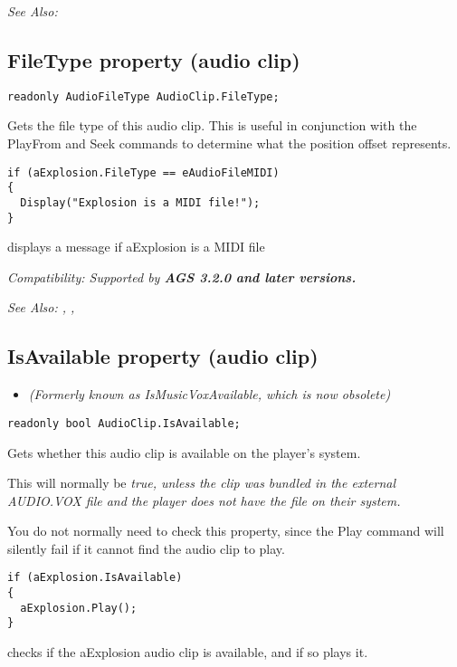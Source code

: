 \it{See Also:} 


\subsection{FileType property (audio clip)}\label{AudioClip.FileType}%

\begin{verbatim}
readonly AudioFileType AudioClip.FileType;
\end{verbatim}
Gets the file type of this audio clip. This is useful in conjunction with the PlayFrom
and Seek commands to determine what the position offset represents.

\begin{verbatim}
if (aExplosion.FileType == eAudioFileMIDI)
{
  Display("Explosion is a MIDI file!");
}
\end{verbatim}
displays a message if aExplosion is a MIDI file

\it{Compatibility:} Supported by \bf{AGS 3.2.0} and later versions.

\it{See Also:} ,
,


\subsection{IsAvailable property (audio clip)}\label{AudioClip.IsAvailable}%

\begin{itemize}
\item \it{(Formerly known as IsMusicVoxAvailable, which is now obsolete)}
\end{itemize}

\begin{verbatim}
readonly bool AudioClip.IsAvailable;
\end{verbatim}
Gets whether this audio clip is available on the player's system.

This will normally be \it{true}, unless the clip was bundled in the external AUDIO.VOX
file and the player does not have the file on their system.

You do not normally need to check this property, since the Play command will silently
fail if it cannot find the audio clip to play.

\begin{verbatim}
if (aExplosion.IsAvailable)
{
  aExplosion.Play();
}
\end{verbatim}
checks if the aExplosion audio clip is available, and if so plays it.

